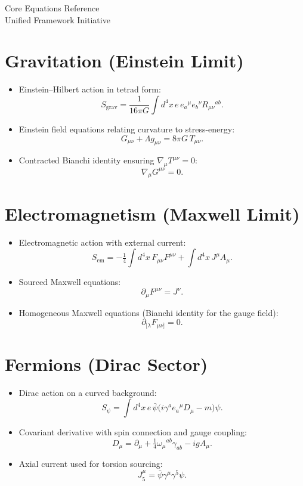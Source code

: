 \documentclass[11pt]{article}
\begin{document}
\begin{center}
{\LARGE Core Equations Reference}\\[1ex]
Unified Framework Initiative
\end{center}

\section*{Gravitation (Einstein Limit)}
\begin{itemize}
    \item Einstein--Hilbert action in tetrad form:
    \[
    S_{\text{grav}} = \frac{1}{16\pi G}\int d^4x\, e\, e_a{}^\mu e_b{}^\nu R_{\mu\nu}{}^{ab}.
    \]
    \item Einstein field equations relating curvature to stress-energy:
    \[
    G_{\mu\nu} + \Lambda g_{\mu\nu} = 8\pi G\, T_{\mu\nu}.
    \]
    \item Contracted Bianchi identity ensuring $\nabla_\mu T^{\mu\nu} = 0$:
    \[
    \nabla_\mu G^{\mu\nu} = 0.
    \]
\end{itemize}

\section*{Electromagnetism (Maxwell Limit)}
\begin{itemize}
    \item Electromagnetic action with external current:
    \[
    S_{\text{em}} = -\tfrac{1}{4}\int d^4x\, F_{\mu\nu}F^{\mu\nu} + \int d^4x\, J^\mu A_\mu.
    \]
    \item Sourced Maxwell equations:
    \[
    \partial_\mu F^{\mu\nu} = J^\nu.
    \]
    \item Homogeneous Maxwell equations (Bianchi identity for the gauge field):
    \[
    \partial_{[\lambda}F_{\mu\nu]} = 0.
    \]
\end{itemize}

\section*{Fermions (Dirac Sector)}
\begin{itemize}
    \item Dirac action on a curved background:
    \[
    S_\psi = \int d^4x\, e\, \bar{\psi}\big(i\gamma^a e_a{}^\mu D_\mu - m\big)\psi.
    \]
    \item Covariant derivative with spin connection and gauge coupling:
    \[
    D_\mu = \partial_\mu + \tfrac{1}{4}\omega_\mu{}^{ab}\gamma_{ab} - igA_\mu.
    \]
    \item Axial current used for torsion sourcing:
    \[
    J_5^\mu = \bar{\psi}\gamma^\mu\gamma^5\psi.
    \]
\end{itemize}
\end{document}
